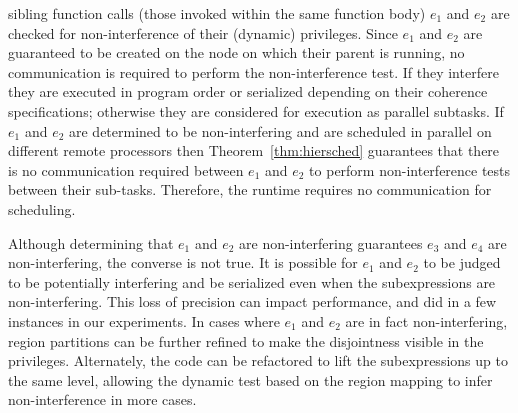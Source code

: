 sibling function calls (those invoked within the same
function body) $e_1$ and $e_2$ are checked for non-interference of their (dynamic)
privileges.  Since $e_1$ and $e_2$ are guaranteed to be created on the node on which their parent
is running, no communication is required to perform the non-interference
test.  If they interfere they are executed in program order or serialized
depending on their coherence specifications; otherwise they are
considered for execution as parallel subtasks.    If $e_1$ and $e_2$ are 
determined to be non-interfering and are scheduled in parallel on different 
remote processors then Theorem~\ref{thm:hiersched}
guarantees that there is no communication required between $e_1$ and $e_2$
to perform non-interference tests between their sub-tasks.  Therefore,
the runtime requires no communication for scheduling.

Although determining that $e_1$
and $e_2$ are non-interfering guarantees $e_3$ and $e_4$ are
non-interfering, the converse is not true.  It is possible for $e_1$
and $e_2$ to be judged to be potentially interfering and be serialized
even when the subexpressions are non-interfering.  This loss of
precision can impact performance, and did in a few instances in our
experiments.  
In cases where $e_1$ and $e_2$ are in fact
non-interfering, region partitions can be further refined to make the
disjointness visible in the privileges.  Alternately, the code can be
refactored to lift the subexpressions up to the same level, allowing
the dynamic test based on the region mapping to infer non-interference
in more cases.  

